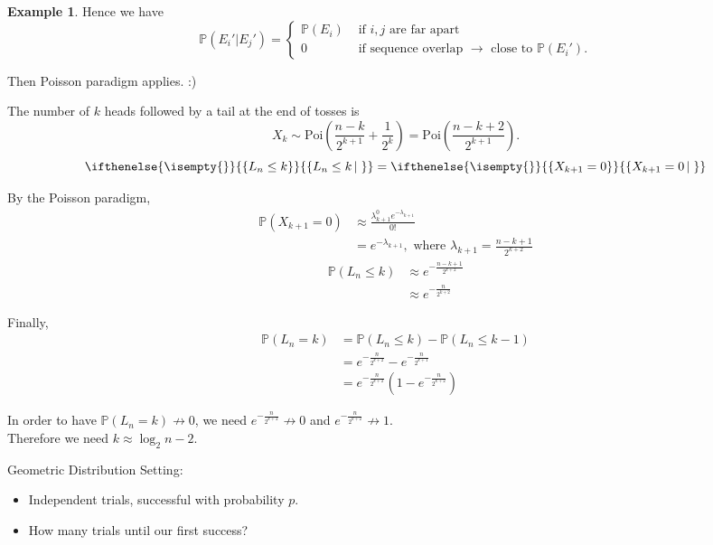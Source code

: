 \documentclass[a4paper,11pt]{amsbook}
\makeatletter
\def\section{\@startsection{section}{2}%
    \z@{1\linespacing\@plus1\linespacing}{.5\linespacing}%
    {\large\normalfont\bfseries\centering\color{darkblue}}}
\theoremstyle{definition}
\newtheorem{example}{\hspace{-2em} \color{darkblue} Example}[chapter]
\theoremstyle{remark}
\renewcommand{\P}{\mathbb{P}}
\newcommand\0{\varnothing}
\newcommand\Poi{\text{Poi}}
\newcommand\set[2][]
{
    \ifthenelse{\isempty{#1}}
    {
        \left\{#2\right\}
    }
    {
        \left\{#2\left|\,#1\right.\right\}
    }
}
\makeatother
\begin{document}
\begin{example}
        Hence we have $$\P(E_i'|E_j')=\begin{cases}
            \P(E_i) & \text{ if }i,j\text{ are far apart } \\
            0 & \text{ if sequence overlap }\to\text{ close to $\P(E_i')$}. %
        \end{cases}$$

        Then Poisson paradigm applies. :)

        The number of $k$ heads followed by a tail at the end of tosses is 
        $$X_k\sim\Poi\left(\frac{n-k}{2^{k+1}}+\frac1{2^k}\right)=\Poi\left(\frac{n-k+2}{2^{k+1}}\right).$$
        $$\set{L_n\leq k}=\set{X_{k+1}=0}$$

        By the Poisson paradigm, \begin{align*}
            \P(X_{k+1}=0)&\approx\frac{\lambda_{k+1}^0e^{-\lambda_{k+1}}}{0!} \\
            &=e^{-\lambda_{k+1}},\text{ where }\lambda_{k+1}=\frac{n-k+1}{2^{k+2}}
        \end{align*}
        \begin{align*}
            \P(L_n\leq k)&\approx e^{-\frac{n-k+1}{2^{k+2}}} \\
            &\approx e^{-\frac{n}{2^{k+2}}}
        \end{align*}
        
        Finally,
        \begin{align*}
            \P(L_n=k)&=\P(L_n\leq k)-\P(L_n\leq k-1) \\
            &=e^{-\frac{n}{2^{k+2}}}-e^{-\frac{n}{2^{k+1}}} \\
            &=e^{-\frac{n}{2^{k+2}}}\left(1-e^{-\frac{n}{2^{k+2}}}\right)
        \end{align*}

        In order to have $\P(L_n=k)\not\to0$, we need $e^{-\frac{n}{2^{k+2}}}\not\to0$ and $e^{-\frac{n}{2^{k+2}}}\not\to1$.\\
        Therefore we need $k\approx\log_2n-2$.
    \end{example}

    \section{Geometric Distribution}
    Setting: \begin{itemize}
        \item Independent trials, successful with probability $p$.
        \item How many trials until our first success?
    \end{itemize}
    
\end{document}
